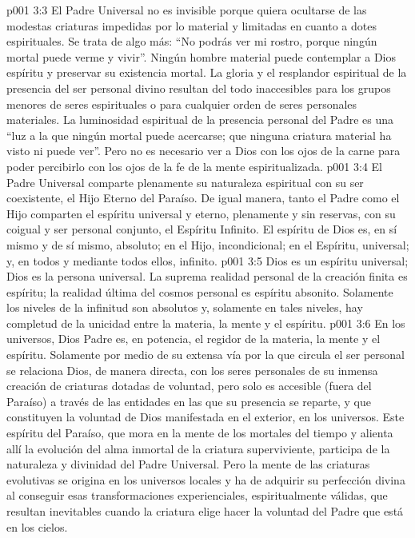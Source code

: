 \vs p001 3:3 El Padre Universal no es invisible porque quiera ocultarse de las modestas criaturas impedidas por lo material y limitadas en cuanto a dotes espirituales. Se trata de algo más: “No podrás ver mi rostro, porque ningún mortal puede verme y vivir”. Ningún hombre material puede contemplar a Dios espíritu y preservar su existencia mortal. La gloria y el resplandor espiritual de la presencia del ser personal divino resultan del todo inaccesibles para los grupos menores de seres espirituales o para cualquier orden de seres personales materiales. La luminosidad espiritual de la presencia personal del Padre es una “luz a la que ningún mortal puede acercarse; que ninguna criatura material ha visto ni puede ver”. Pero no es necesario ver a Dios con los ojos de la carne para poder percibirlo con los ojos de la fe de la mente espiritualizada.
\vs p001 3:4 \pc El Padre Universal comparte plenamente su naturaleza espiritual con su ser coexistente, el Hijo Eterno del Paraíso. De igual manera, tanto el Padre como el Hijo comparten el espíritu universal y eterno, plenamente y sin reservas, con su coigual y ser personal conjunto, el Espíritu Infinito. El espíritu de Dios es, en sí mismo y de sí mismo, absoluto; en el Hijo, incondicional; en el Espíritu, universal; y, en todos y mediante todos ellos, infinito.
\vs p001 3:5 \pc Dios es un espíritu universal; Dios es la persona universal. La suprema realidad personal de la creación finita es espíritu; la realidad última del cosmos personal es espíritu absonito. Solamente los niveles de la infinitud son absolutos y, solamente en tales niveles, hay completud de la unicidad entre la materia, la mente y el espíritu.
\vs p001 3:6 \pc En los universos, Dios Padre es, en potencia, el regidor de la materia, la mente y el espíritu. Solamente por medio de su extensa vía por la que circula el ser personal se relaciona Dios, de manera directa, con los seres personales de su inmensa creación de criaturas dotadas de voluntad, pero solo es accesible (fuera del Paraíso) a través de las entidades en las que su presencia se reparte, y que constituyen la voluntad de Dios manifestada en el exterior, en los universos. Este espíritu del Paraíso, que mora en la mente de los mortales del tiempo y alienta allí la evolución del alma inmortal de la criatura superviviente, participa de la naturaleza y divinidad del Padre Universal. Pero la mente de las criaturas evolutivas se origina en los universos locales y ha de adquirir su perfección divina al conseguir esas transformaciones experienciales, espiritualmente válidas, que resultan inevitables cuando la criatura elige hacer la voluntad del Padre que está en los cielos.
